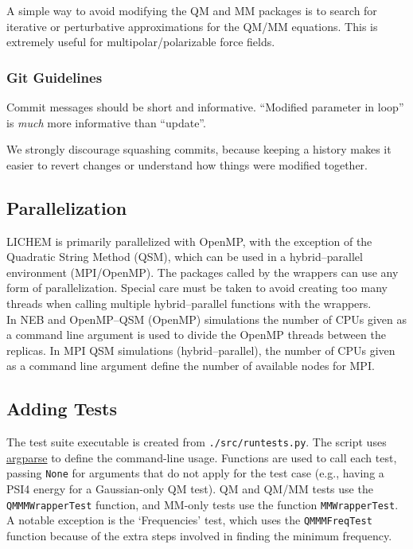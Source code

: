 \documentclass[12pt]{report}
\begin{document}
A simple way to avoid modifying the QM and MM packages is to search for
iterative or perturbative approximations for the QM/MM equations.
This is extremely useful for multipolar/polarizable force fields. \\

\subsubsection{Git Guidelines}

Commit messages should be short and informative.
``Modified parameter in loop'' is \emph{much} more informative than ``update''.

We strongly discourage squashing commits, because keeping a history makes it
easier to revert changes or understand how things were modified together.

\subsection{Parallelization}

LICHEM is primarily parallelized with OpenMP, with the exception
of the Quadratic String Method (QSM), which can be used in a
hybrid--parallel environment (MPI/OpenMP).  The packages called by the
wrappers can use any form of parallelization.
Special care must be taken to avoid creating too many threads when calling
multiple hybrid--parallel functions with the wrappers. \\

In NEB and OpenMP--QSM (OpenMP) simulations the number of CPUs given as a
command line argument is used to divide the OpenMP threads between the 
replicas.
In MPI QSM simulations (hybrid--parallel), the number of CPUs given as a
command line argument define the number of available nodes for MPI.

\subsection{Adding Tests}\label{subsec:add-tests}

The test suite executable is created from \texttt{./src/runtests.py}.
The script uses
\href{https://docs.python.org/3.10/library/argparse.html}{argparse}
to define the command-line usage.
Functions are used to call each test, passing \texttt{None} for 
arguments that do not apply for the test case (e.g., having a 
PSI4 energy for a Gaussian-only QM test).
QM and QM/MM tests use the \texttt{QMMMWrapperTest} function, 
and MM-only tests use the function \texttt{MMWrapperTest}.
A notable exception is the `Frequencies' test, which uses the 
\texttt{QMMMFreqTest} function because of the extra steps involved
in finding the minimum frequency. \\
\end{document}
